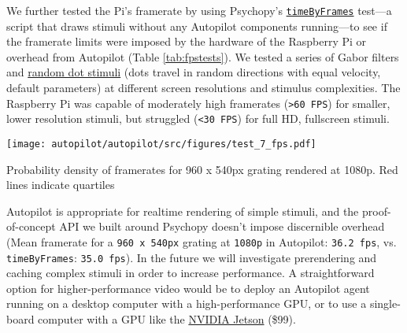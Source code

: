 We further tested the Pi's framerate by using Psychopy's \href{https://github.com/psychopy/psychopy/blob/3.1/psychopy/demos/coder/timing/timeByFrames.py}{\texttt{timeByFrames}} test---a script that draws stimuli without any Autopilot components running---to see if the framerate limits were imposed by the hardware of the Raspberry Pi or overhead from Autopilot (Table \ref{tab:fpstests}). We tested a series of Gabor filters and \href{https://www.psychopy.org/api/visual/dotstim.html#psychopy.visual.DotStim}{random dot stimuli} (dots travel in random directions with equal velocity, default parameters) at different screen resolutions and stimulus complexities. The Raspberry Pi was capable of moderately high framerates (\texttt{>60 FPS}) for smaller, lower resolution stimuli, but struggled (\texttt{<30 FPS}) for full HD, fullscreen stimuli.

\clearpage

\begin{marginfigure}[0.5cm]
\texttt{[image: autopilot/autopilot/src/figures/test\_7\_fps.pdf]}
\caption{Probability density of framerates for 960 x 540px grating rendered at 1080p. Red lines indicate quartiles}
\label{fig:framerate}
\end{marginfigure}

Autopilot is appropriate for realtime rendering of simple stimuli, and the proof-of-concept API we built around Psychopy doesn't impose discernible overhead (Mean framerate for a \texttt{960 x 540px} grating at \texttt{1080p} in Autopilot: \texttt{36.2 fps}, vs. \texttt{timeByFrames}: \texttt{35.0 fps}). In the future we will investigate prerendering and caching complex stimuli in order to increase performance. A straightforward option for higher-performance video would be to deploy an Autopilot agent running on a desktop computer with a high-performance GPU, or to use a single-board computer with a GPU like the \href{https://www.nvidia.com/en-us/autonomous-machines/embedded-systems/jetson-nano/}{NVIDIA Jetson} (\$99).

